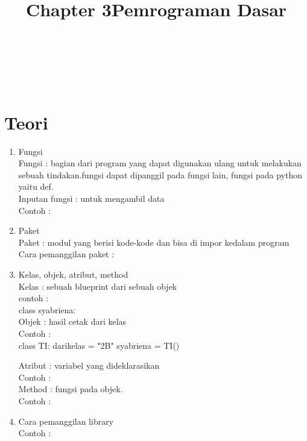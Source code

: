 \clearpage
\setcounter{page}{1}

\begin{center}
\title{\LARGE \bf Chapter 3}\\
\title{\LARGE \bf Pemrograman Dasar}\\
\end{center}

\appendix
\section{Teori}

\begin{enumerate}
\item Fungsi\\
Fungsi : bagian dari program yang dapat digunakan ulang untuk melakukan sebuah tindakan.fungsi dapat dipanggil pada fungsi lain, fungsi pada python yaitu def.\\
Inputan fungsi : untuk mengambil data\\
Contoh :\\


\item Paket\\
Paket : modul yang berisi kode-kode dan bisa di impor kedalam program\\
Cara pemanggilan paket : \\


\item Kelas, objek, atribut, method\\
Kelas : sebuah blueprint dari sebuah objek\\
contoh :\\
 class syabriena:\\

Objek : hasil cetak dari kelas\\
Contoh :  \\
class TI:
	dari\textunderscore kelas = "2B"
syabriena = TI()

Atribut : variabel yang dideklarasikan\\
Contoh : \\

Method : fungsi pada objek.\\
Contoh : \\

\item Cara pemanggilan library\\
Contoh :\\



\end{enumerate}
